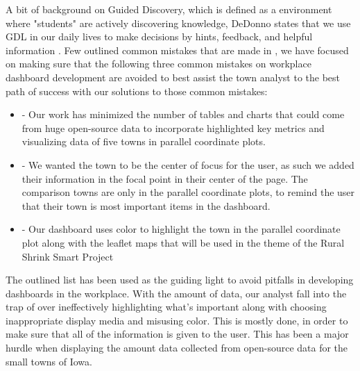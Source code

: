 \documentclass[10pt]{article}\usepackage[]{graphicx}\usepackage[]{color}
\begin{document}


A bit of background on Guided Discovery, which is defined as a environment where "students" are actively discovering knowledge, DeDonno states that we use GDL in our daily lives to make decisions by hints, feedback, and helpful information \cite{dedonno}.
Few outlined common mistakes that are made in , we have focused on making sure that the following three common mistakes on workplace dashboard development are avoided to best assist the town analyst to the best path of success with our solutions to those common mistakes:
\begin{itemize}
\item{ - Our work has minimized the number of tables and charts that could come from huge open-source data to incorporate highlighted key metrics and visualizing data of five towns in parallel coordinate plots. }
\item{ - We wanted the town to be the center of focus for the user, as such we added their information in the focal point in their center of the page. The comparison towns are only in the parallel coordinate plots, to remind the user that their town is most important items in the dashboard.}
\item{ - Our dashboard uses color to highlight the town in the parallel coordinate plot along with the leaflet maps that will be used in the theme of the Rural Shrink Smart Project}
\end{itemize}

The outlined list has been used as the guiding light to avoid pitfalls in developing dashboards in the workplace. With the amount of data, our analyst fall into the trap of over ineffectively highlighting what's important along with choosing inappropriate display media and misusing color. This is mostly done, in order to make sure that all of the information is given to the user. This has been a major hurdle when displaying the amount data collected from open-source data for the small towns of Iowa.
\end{document}
